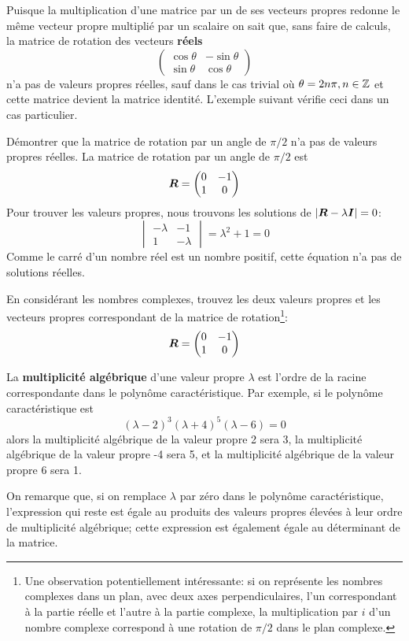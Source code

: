 Puisque la multiplication d'une matrice par un de ses vecteurs propres redonne le même vecteur
propre multiplié par un scalaire on sait que, sans faire de calculs, la matrice
de rotation des vecteurs \textbf{réels}
\[
\begin{pmatrix}
\cos\theta & -\sin\theta \\
\sin\theta & \cos\theta
\end{pmatrix}
\]
n'a pas de valeurs propres réelles, sauf dans le cas trivial où $\theta = 2 n \pi, n\in\mathbb{Z}$ et
cette matrice devient la matrice identité.  L'exemple suivant vérifie ceci dans un cas particulier.
\begin{exemple}
Démontrer que la matrice de rotation par un angle de $\pi/2$ n'a pas de valeurs
propres réelles.
\solution
La  matrice de rotation par un angle de $\pi/2$ est
\[
\boldsymbol{R} = 
\begin{pmatrix}
0 & -1 \\ 1 & 0
\end{pmatrix}
\]
Pour trouver les valeurs propres, nous trouvons les solutions de $|\boldsymbol{R} - \lambda \boldsymbol{I}|=0$:
\[
\begin{vmatrix}
-\lambda & -1 \\ 1 & -\lambda
\end{vmatrix}
= \lambda^2 + 1 = 0
\]
Comme le carré d'un nombre réel est un nombre positif, cette équation n'a pas de solutions réelles.
\end{exemple}
\begin{exerciceC}
En considérant les nombres complexes, trouvez les deux valeurs propres et les vecteurs propres
correspondant de la matrice de rotation\footnote{Une observation potentiellement intéressante: 
si on représente les nombres complexes dans un
plan, avec deux axes perpendiculaires, l'un correspondant à la partie réelle et l'autre à
la partie complexe, la multiplication par $i$ d'un nombre complexe correspond à
une rotation de $\pi/2$ dans le plan complexe.}:
\[
\boldsymbol{R} = 
\begin{pmatrix}
0 & -1 \\ 1 & 0
\end{pmatrix}
\]

\end{exerciceC}

\begin{defini}
La \textbf{multiplicité algébrique} d'une valeur propre $\lambda$ est l'ordre de la racine
correspondante dans le polynôme caractéristique.  Par exemple, si le polynôme caractéristique
est
\[
(\lambda - 2)^3 (\lambda+4)^5 (\lambda-6)= 0
\]
alors la multiplicité algébrique de la valeur propre 2 sera 3, la multiplicité algébrique de la valeur
propre -4 sera 5, et la multiplicité algébrique de la valeur propre 6 sera 1. 
\end{defini}
On remarque que, si on remplace $\lambda$ par zéro dans le polynôme caractéristique,
l'expression qui reste est égale au produits des valeurs propres élevées à leur ordre
de multiplicité algébrique; cette expression est également égale au déterminant de la matrice.

